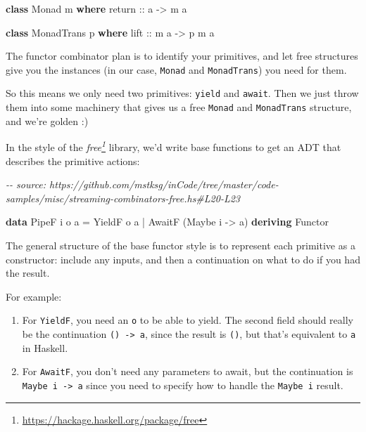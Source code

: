 \documentclass[]{article}
\newenvironment{Shaded}{}{}
\newcommand{\CommentTok}[1]{\textcolor[rgb]{0.38,0.63,0.69}{\textit{#1}}}
\newcommand{\DataTypeTok}[1]{\textcolor[rgb]{0.56,0.13,0.00}{#1}}
\newcommand{\KeywordTok}[1]{\textcolor[rgb]{0.00,0.44,0.13}{\textbf{#1}}}
\newcommand{\NormalTok}[1]{#1}
\newcommand{\OperatorTok}[1]{\textcolor[rgb]{0.40,0.40,0.40}{#1}}
\newcommand{\OtherTok}[1]{\textcolor[rgb]{0.00,0.44,0.13}{#1}}
\renewcommand{\href}[2]{#2\footnote{\url{#1}}}
\begin{document}
\begin{Shaded}
\begin{Highlighting}[]
\KeywordTok{class} \DataTypeTok{Monad}\NormalTok{ m }\KeywordTok{where}
\OtherTok{    return ::}\NormalTok{ a }\OtherTok{{-}>}\NormalTok{ m a}

\KeywordTok{class} \DataTypeTok{MonadTrans}\NormalTok{ p }\KeywordTok{where}
\OtherTok{    lift ::}\NormalTok{ m a }\OtherTok{{-}>}\NormalTok{ p m a}
\end{Highlighting}
\end{Shaded}

The functor combinator plan is to identify your primitives, and let free
structures give you the instances (in our case, \texttt{Monad} and
\texttt{MonadTrans}) you need for them.

So this means we only need two primitives: \texttt{yield} and \texttt{await}.
Then we just throw them into some machinery that gives us a free \texttt{Monad}
and \texttt{MonadTrans} structure, and we're golden :)

In the style of the \emph{\href{https://hackage.haskell.org/package/free}{free}}
library, we'd write base functions to get an ADT that describes the primitive
actions:

\begin{Shaded}
\begin{Highlighting}[]
\CommentTok{{-}{-} source: https://github.com/mstksg/inCode/tree/master/code{-}samples/misc/streaming{-}combinators{-}free.hs\#L20{-}L23}

\KeywordTok{data} \DataTypeTok{PipeF}\NormalTok{ i o a }\OtherTok{=}
    \DataTypeTok{YieldF}\NormalTok{ o a}
  \OperatorTok{|} \DataTypeTok{AwaitF}\NormalTok{ (}\DataTypeTok{Maybe}\NormalTok{ i }\OtherTok{{-}>}\NormalTok{ a)}
    \KeywordTok{deriving} \DataTypeTok{Functor}
\end{Highlighting}
\end{Shaded}

The general structure of the base functor style is to represent each primitive
as a constructor: include any inputs, and then a continuation on what to do if
you had the result.

For example:

\begin{enumerate}
\def\labelenumi{\arabic{enumi}.}
\tightlist
\item
  For \texttt{YieldF}, you need an \texttt{o} to be able to yield. The second
  field should really be the continuation \texttt{()\ -\textgreater{}\ a}, since
  the result is \texttt{()}, but that's equivalent to \texttt{a} in Haskell.
\item
  For \texttt{AwaitF}, you don't need any parameters to await, but the
  continuation is \texttt{Maybe\ i\ -\textgreater{}\ a} since you need to
  specify how to handle the \texttt{Maybe\ i} result.
\end{enumerate}
\end{document}
